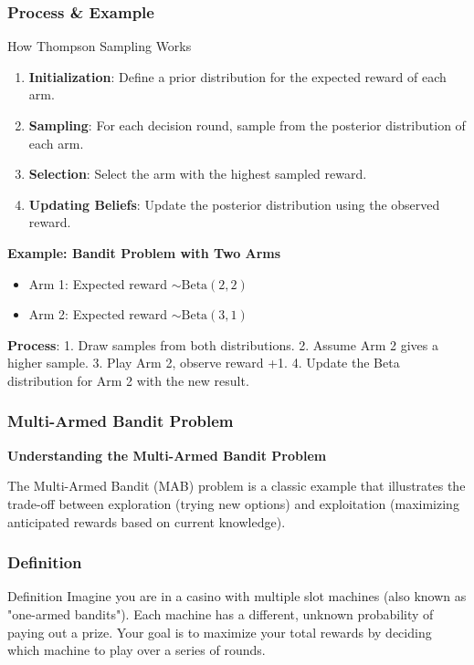 \documentclass[aspectratio=169]{beamer}
\begin{document}
\begin{frame}[fragile]
    \frametitle{Process & Example}
    \begin{block}{How Thompson Sampling Works}
        \begin{enumerate}
            \item \textbf{Initialization}: Define a prior distribution for the expected reward of each arm.
            \item \textbf{Sampling}: For each decision round, sample from the posterior distribution of each arm.
            \item \textbf{Selection}: Select the arm with the highest sampled reward.
            \item \textbf{Updating Beliefs}: Update the posterior distribution using the observed reward.
        \end{enumerate}
    \end{block}
    
    \begin{example}
        \textbf{Example: Bandit Problem with Two Arms}
        \begin{itemize}
            \item Arm 1: Expected reward $\sim \text{Beta}(2, 2)$
            \item Arm 2: Expected reward $\sim \text{Beta}(3, 1)$
        \end{itemize}
        \textbf{Process}:
        1. Draw samples from both distributions.
        2. Assume Arm 2 gives a higher sample.
        3. Play Arm 2, observe reward +1.
        4. Update the Beta distribution for Arm 2 with the new result.
    \end{example}
\end{frame}

\begin{frame}[fragile]
    \frametitle{Multi-Armed Bandit Problem}
    \textbf{Understanding the Multi-Armed Bandit Problem}

    The Multi-Armed Bandit (MAB) problem is a classic example that illustrates the trade-off between exploration (trying new options) and exploitation (maximizing anticipated rewards based on current knowledge).
\end{frame}

\begin{frame}[fragile]
    \frametitle{Definition}
    \begin{block}{Definition}
        Imagine you are in a casino with multiple slot machines (also known as "one-armed bandits"). Each machine has a different, unknown probability of paying out a prize. Your goal is to maximize your total rewards by deciding which machine to play over a series of rounds.
    \end{block}
\end{frame}
\end{document}
